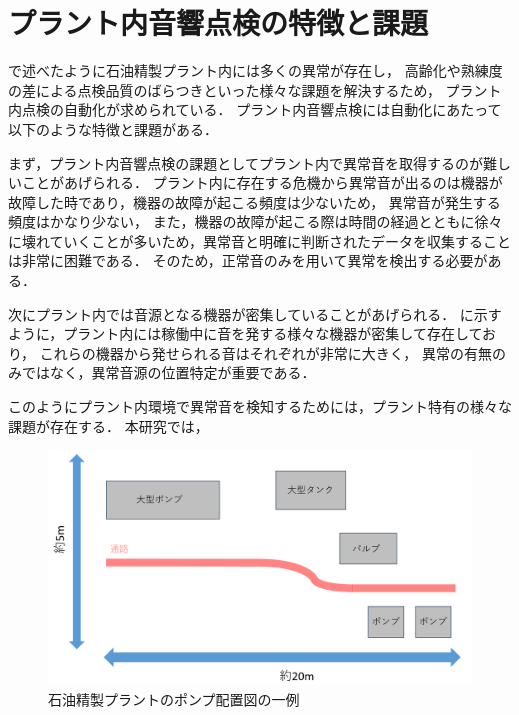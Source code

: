 \documentclass[../main]{subfiles}
\begin{document}
\section{プラント内音響点検の特徴と課題}
\label{sec:intro_anomaly-detection}
で述べたように石油精製プラント内には多くの異常が存在し，
高齢化や熟練度の差による点検品質のばらつきといった様々な課題を解決するため，
プラント内点検の自動化が求められている．
プラント内音響点検には自動化にあたって以下のような特徴と課題がある．


まず，プラント内音響点検の課題としてプラント内で異常音を取得するのが難しいことがあげられる．
プラント内に存在する危機から異常音が出るのは機器が故障した時であり，機器の故障が起こる頻度は少ないため，
異常音が発生する頻度はかなり少ない，
また，機器の故障が起こる際は時間の経過とともに徐々に壊れていくことが多いため，異常音と明確に判断されたデータを収集することは非常に困難である．
そのため，正常音のみを用いて異常を検出する必要がある．

次にプラント内では音源となる機器が密集していることがあげられる．
に示すように，プラント内には稼働中に音を発する様々な機器が密集して存在しており，
これらの機器から発せられる音はそれぞれが非常に大きく，
異常の有無のみではなく，異常音源の位置特定が重要である．

このようにプラント内環境で異常音を検知するためには，プラント特有の様々な課題が存在する．
本研究では，

\begin{figure}[t]
  \centering
  \includegraphics[keepaspectratio, width=1.0\linewidth]{chap1/pump_location.png}
  \caption{石油精製プラントのポンプ配置図の一例}
  \label{fig:pump_location}
\end{figure}
\end{document}
